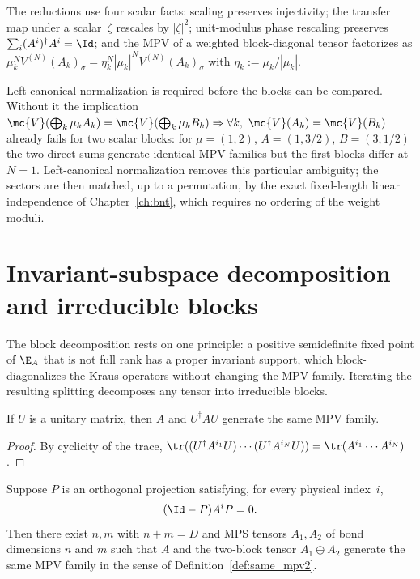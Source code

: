 \begin{remark}
    The reductions use four scalar facts: scaling preserves injectivity; the
    transfer map under a scalar~$\zeta$ rescales by $|\zeta|^2$; unit-modulus
    phase rescaling preserves $\sum_i (A^i)^\dagger A^i = \Id$; and the MPV of a
    weighted block-diagonal tensor factorizes as
    $\mu_k^N V^{(N)}(A_k)_\sigma = \eta_k^N |\mu_k|^N V^{(N)}(A_k)_\sigma$ with
    $\eta_k := \mu_k/|\mu_k|$.

    Left-canonical normalization is required before the blocks can be compared.
    Without it the implication
    $\mc{V}(\bigoplus_k \mu_k A_k) = \mc{V}(\bigoplus_k \mu_k B_k)
        \Rightarrow \forall k,\ \mc{V}(A_k)=\mc{V}(B_k)$
    already fails for two scalar blocks: for $\mu=(1,2)$, $A=(1,3/2)$,
    $B=(3,1/2)$ the two direct sums generate identical MPV families but the first
    blocks differ at $N=1$. Left-canonical normalization removes this particular
    ambiguity; the sectors are then matched, up to a permutation, by the exact
    fixed-length linear independence of Chapter~\ref{ch:bnt}, which requires no
    ordering of the weight moduli.
\end{remark}

\section{Invariant-subspace decomposition and irreducible blocks}

The block decomposition rests on one principle: a positive semidefinite fixed
point of $\E_A$ that is not full rank has a proper invariant support, which
block-diagonalizes the Kraus operators without changing the MPV family. Iterating
the resulting splitting decomposes any tensor into irreducible blocks.

\begin{theorem}\label{thm:samempv_unitary}
    \leanok
    If $U$ is a unitary matrix, then $A$ and $U^\dagger A U$
    generate the same MPV family.
\end{theorem}

\begin{proof}\leanok
    By cyclicity of the trace,
    $\tr((U^\dagger A^{i_1} U) \cdots (U^\dagger A^{i_N} U))
        = \tr(A^{i_1} \cdots A^{i_N})$.
\end{proof}

\begin{theorem}\label{thm:lowerzero_two_block}
    \leanok
    Suppose $P$ is an orthogonal projection satisfying, for every physical
    index~$i$,
    \[
        (\Id - P) A^i P = 0.
    \]
    Then there exist $n,m$ with $n + m = D$ and MPS tensors $A_1, A_2$ of bond
    dimensions $n$ and $m$ such that $A$ and the two-block tensor
    $A_1 \oplus A_2$ generate the same MPV family in the sense of
    Definition~\ref{def:same_mpv2}.
\end{theorem}

